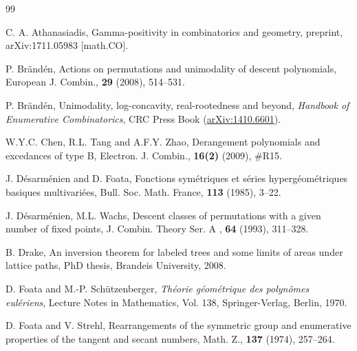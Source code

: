 \documentclass[12pt]{amsart}
\numberwithin{equation}{section}
\theoremstyle{plain}
\theoremstyle{definition}
\begin{document}
\begin{thebibliography}{99}
%

 C. A. Athanasiadis, Gamma-positivity in combinatorics and geometry,  	preprint, arXiv:1711.05983 [math.CO].

 P. Br\"and\'en, Actions on permutations and unimodality of descent polynomials, European J. Combin., {\bf29} (2008), 514--531. 

 P. Br\"and\'en, Unimodality, log-concavity, real-rootedness and beyond, {\em Handbook of Enumerative Combinatorics}, CRC Press Book (\href{http://arxiv.org/abs/1410.6601}{arXiv:1410.6601}).






W.Y.C. Chen, R.L. Tang and A.F.Y. Zhao, Derangement polynomials and excedances of type B, Electron. J. Combin., {\bf16(2)} (2009), \#R15.


 J. D\'esarm\'enien and  D. Foata,
 Fonctions sym\'etriques et s\'eries hyperg\'eom\'etriques basiques multivari\'ees,
 Bull. Soc. Math. France, {\bf113} (1985),  3--22.

 J. D\'esarm\'enien, M.L. Wachs, 
Descent classes of permutations with a given number of fixed points, 
J. Combin. Theory Ser. A , {\bf64} (1993), 311--328. 



 B. Drake, An inversion theorem for labeled trees and some limits of areas under lattice paths, PhD thesis, Brandeis University, 2008.

 D. Foata and M.-P. Sch\"utzenberger, {\em Th\'eorie g\'eom\'etrique des polyn\^omes eul\'eriens},  Lecture Notes in Mathematics, Vol. 138, Springer-Verlag, Berlin, 1970.

D. Foata and V. Strehl, Rearrangements of the symmetric group and enumerative properties of the tangent and secant numbers, Math. Z., {\bf137} (1974), 257--264.


\end{thebibliography}
\end{document}
